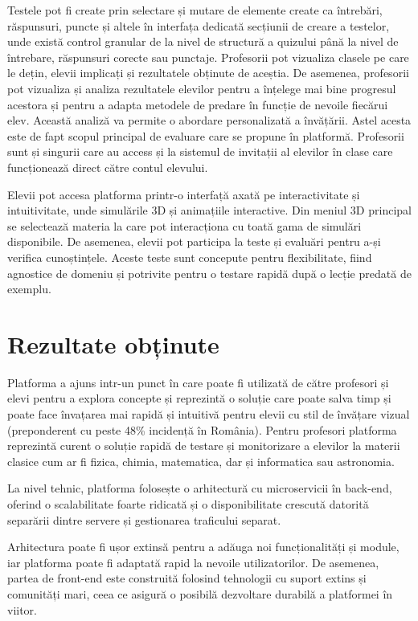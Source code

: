 Testele pot fi create prin selectare și mutare de elemente create ca întrebări, răspunsuri, puncte și altele
în interfața dedicată secțiunii de creare a testelor, unde există
control granular de la nivel de structură a quizului până la nivel de întrebare, răspunsuri corecte sau punctaje.
Profesorii pot vizualiza clasele pe care le dețin,
elevii implicați și rezultatele obținute de aceștia. De asemenea, profesorii pot vizualiza
și analiza rezultatele elevilor pentru a înțelege mai bine progresul acestora și pentru a adapta metodele de
predare în funcție de nevoile fiecărui elev. Această analiză va permite o abordare personalizată a învățării.
Astel acesta este de fapt scopul principal de evaluare care se propune în platformă. Profesorii sunt
și singurii care au access și la sistemul de invitații al elevilor în clase care funcționează direct către contul elevului.

Elevii pot accesa platforma printr-o interfață axată pe interactivitate și intuitivitate, unde simulările 3D și animațiile interactive. 
Din meniul 3D principal se selectează  
materia la care pot interacționa cu toată gama de simulări disponibile. De asemenea, elevii pot participa la teste și evaluări
pentru a-și verifica cunoștințele. Aceste teste sunt concepute
pentru flexibilitate, fiind agnostice de domeniu și potrivite pentru o testare rapidă după o lecție predată de exemplu.

\section{Rezultate obținute}
\label{sec:proj}

Platforma a ajuns intr-un punct în care poate fi utilizată de către profesori și elevi pentru a explora concepte
și reprezintă o soluție care poate salva timp și poate face învațarea mai rapidă și intuitivă pentru elevii
cu stil de învățare vizual (preponderent cu peste 48\% incidență în România). Pentru profesori platforma reprezintă
curent o soluție rapidă de testare și monitorizare a elevilor la materii clasice cum ar fi fizica, chimia, matematica, dar și informatica sau astronomia.

La nivel tehnic, platforma folosește o arhitectură cu microservicii în back-end, oferind o scalabilitate
foarte ridicată și o disponibilitate crescută datorită separării dintre servere și gestionarea
traficului separat. 

Arhitectura poate fi ușor extinsă pentru a adăuga noi funcționalități și module, iar platforma poate fi 
adaptată rapid la nevoile utilizatorilor. De asemenea, partea de front-end este construită folosind tehnologii
cu suport extins și comunități mari, ceea ce asigură o posibilă dezvoltare durabilă a 
platformei în viitor. 

